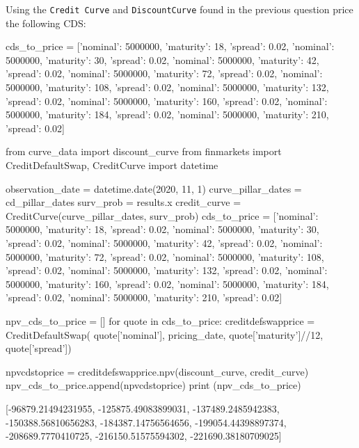 \begin{question}
Using the \texttt{Credit\ Curve} and \texttt{DiscountCurve} found in the previous question price the following CDS:
\end{question}

\begin{ipython}
cds_to_price = [{'nominal': 5000000, 'maturity': 18, 'spread': 0.02},
                {'nominal': 5000000, 'maturity': 30, 'spread': 0.02},
                {'nominal': 5000000, 'maturity': 42, 'spread': 0.02},
                {'nominal': 5000000, 'maturity': 72, 'spread': 0.02},
                {'nominal': 5000000, 'maturity': 108, 'spread': 0.02},
                {'nominal': 5000000, 'maturity': 132, 'spread': 0.02},
                {'nominal': 5000000, 'maturity': 160, 'spread': 0.02},
                {'nominal': 5000000, 'maturity': 184, 'spread': 0.02},
                {'nominal': 5000000, 'maturity': 210, 'spread': 0.02}]
\end{ipython}

\begin{solution}
\end{solution}

\begin{ipython}
from curve_data import discount_curve
from finmarkets import CreditDefaultSwap, CreditCurve
import datetime

observation_date = datetime.date(2020, 11, 1)
curve_pillar_dates = cd_pillar_dates
surv_prob = results.x
credit_curve = CreditCurve(curve_pillar_dates, surv_prob)
cds_to_price = [{'nominal': 5000000, 'maturity': 18, 'spread': 0.02},
                {'nominal': 5000000, 'maturity': 30, 'spread': 0.02},
                {'nominal': 5000000, 'maturity': 42, 'spread': 0.02},
                {'nominal': 5000000, 'maturity': 72, 'spread': 0.02},
                {'nominal': 5000000, 'maturity': 108, 'spread': 0.02},
                {'nominal': 5000000, 'maturity': 132, 'spread': 0.02},
                {'nominal': 5000000, 'maturity': 160, 'spread': 0.02},
                {'nominal': 5000000, 'maturity': 184, 'spread': 0.02},
                {'nominal': 5000000, 'maturity': 210, 'spread': 0.02}]

npv_cds_to_price = []
for quote in cds_to_price:
    creditdefswapprice = CreditDefaultSwap(
        quote['nominal'], pricing_date,
        quote['maturity']//12, quote['spread'])

npvcdstoprice = creditdefswapprice.npv(discount_curve, credit_curve)
npv_cds_to_price.append(npvcdstoprice)
print (npv_cds_to_price)

[-96879.21494231955, -125875.49083899031, -137489.2485942383,
 -150388.56810656283, -184387.14756564656, -199054.44398897374,
 -208689.7770410725, -216150.51575594302, -221690.38180709025]
\end{ipython}

